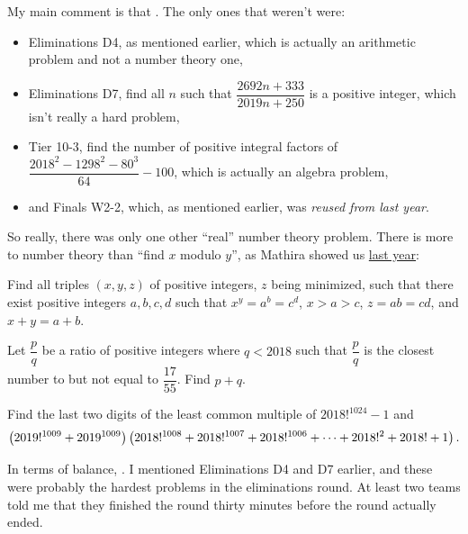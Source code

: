 \documentclass[11pt,paper=letter]{scrartcl}
\begin{document}
My main comment is that . The only ones that weren't were:
\begin{itemize}
  \item Eliminations D4, as mentioned earlier, which is actually an arithmetic problem and not a number theory one,
  \item Eliminations D7, find all $n$ such that $\dfrac{2692n + 333}{2019n + 250}$ is a positive integer, which isn't really a hard problem,
  \item Tier 10-3, find the number of positive integral factors of $\dfrac{2018^2 - 1298^2 - 80^3}{64} - 100$, which is actually an algebra problem,
  \item and Finals W2-2, which, as mentioned earlier, was \emph{reused from last year}.
\end{itemize}
So really, there was only one other ``real'' number theory problem. There is more to number theory than ``find $x$ modulo $y$'', as Mathira showed us \href{http://cjquines.com/files/mathira2018orals.pdf}{last year}:
\begin{probboxed}
   Find all triples $(x, y, z)$ of positive integers, $z$ being minimized, such that there exist positive integers $a, b, c, d$ such that $x^y = a^b = c^d$, $x > a > c$, $z = ab = cd$, and $x + y = a + b$.
\end{probboxed}
\vspace{-10pt}
\begin{probboxed}
   Let $\dfrac pq$ be a ratio of positive integers where $q < 2018$ such that $\dfrac pq$ is the closest number to but not equal to $\dfrac{17}{55}$. Find $p + q$.
\end{probboxed}
\vspace{-10pt}
\begin{probboxed}
   Find the last two digits of the least common multiple of $2018!^{1024} - 1$ and
  $$\left( 2019!^{1009} + 2019^{1009} \right)\left( 2018!^{1008} + 2018!^{1007} + 2018!^{1006} + \cdots + 2018!^2 + 2018! + 1 \right).$$
\end{probboxed}

In terms of balance, . I mentioned Eliminations D4 and D7 earlier, and these were probably the hardest problems in the eliminations round. At least two teams told me that they finished the round thirty minutes before the round actually ended.
\end{document}
